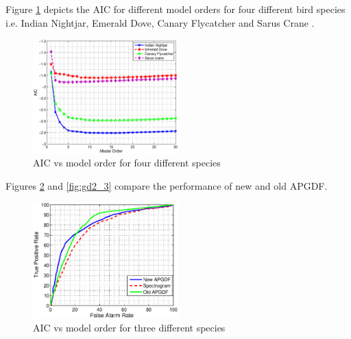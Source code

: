 \documentclass[a4paper]{article}
\begin{document}
 Figure \ref{fig:species_4} depicts the AIC for different model orders for four different bird species i.e. Indian Nightjar, Emerald Dove, Canary Flycatcher and Sarus Crane . 
 
 
 \begin{figure}[!ht]
	\centering
	\includegraphics[width=0.5\textwidth,height=7 cm] {species_4.eps}
	\caption{AIC vs model order for four different species }   
	\label{fig:species_4}
\end{figure} 
 
 
 
 
 Figures \ref{fig:gd1_3} and \ref{fig:gd2_3} compare the performance of new and old APGDF.
 
 
 
 \begin{figure}[!ht]
	\centering
	\includegraphics[width=0.5\textwidth,height=7 cm] {gd1_3.eps}
	\caption{AIC vs model order for three different species }   
	\label{fig:gd1_3}
\end{figure} 

 
 
\end{document}
